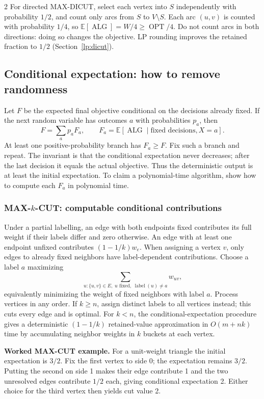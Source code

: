 \documentclass[10pt]{article}
\theoremstyle{definition}
\newcommand{\OPT}{\operatorname{OPT}}
\newcommand{\ALG}{\operatorname{ALG}}
\begin{document}
\begin{multicols*}{2}
For directed MAX-DICUT, select each vertex into $S$ independently with
probability $1/2$, and count only arcs from $S$ to $V\setminus S$.
Each arc $(u,v)$ is counted with probability $1/4$, so
$\mathbb E[\ALG]=W/4\ge\OPT/4$.
Do not count arcs in both directions: doing so changes the objective.
LP rounding improves the retained fraction to $1/2$
(Section~\ref{lp:dicut}).

\subsection{Conditional expectation: how to remove randomness}\label{ra:conditional}
Let $F$ be the expected final objective conditional on the decisions already
fixed. If the next random variable has outcomes $a$ with probabilities $p_a$,
then
\[
  F=\sum_a p_a F_a,\qquad
  F_a=\mathbb E[\ALG\mid\text{fixed decisions},X=a].
\]
At least one positive-probability branch has $F_a\ge F$. Fix such a branch and
repeat. The invariant is that the conditional expectation never decreases;
after the last decision it equals the actual objective. Thus the deterministic
output is at least the initial expectation. To claim a polynomial-time
algorithm, show how to compute each $F_a$ in polynomial time.

\subsubsection*{MAX-$k$-CUT: computable conditional contributions}
Under a partial labelling, an edge with both endpoints fixed contributes its
full weight if their labels differ and zero otherwise. An edge with at least
one endpoint unfixed contributes $(1-1/k)w_e$. When assigning a vertex $v$,
only edges to already fixed neighbors have label-dependent contributions.
Choose a label $a$ maximizing
\[
  \sum_{u:\{u,v\}\in E,\;u\text{ fixed},\;\operatorname{label}(u)\ne a}w_{uv},
\]
equivalently minimizing the weight of fixed neighbors with label $a$.
Process vertices in any order. If $k\ge n$, assign distinct labels to all
vertices instead; this cuts every edge and is optimal. For $k<n$, the
conditional-expectation procedure gives a deterministic
$(1-1/k)$ retained-value approximation in $O(m+nk)$ time by accumulating
neighbor weights in $k$ buckets at each vertex.

\textbf{Worked MAX-CUT example.}
For a unit-weight triangle the initial expectation is $3/2$. Fix the first
vertex to side 0; the expectation remains $3/2$. Putting the second on side 1
makes their edge contribute 1 and the two unresolved edges contribute $1/2$
each, giving conditional expectation 2. Either choice for the third vertex
then yields cut value 2.


\end{multicols*}
\end{document}
